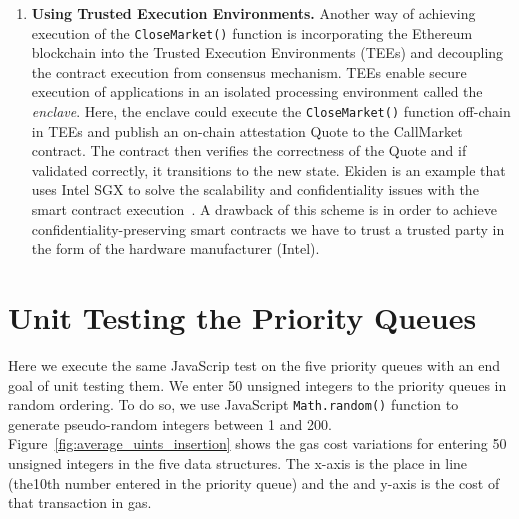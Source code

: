 \begin{enumerate}
\begin{itemize}
\end{itemize}


\item \textbf{{Using Trusted Execution Environments.}} Another way of achieving execution of the \texttt{CloseMarket()} function is incorporating the Ethereum blockchain into the Trusted Execution Environments (TEEs) and decoupling the contract execution from consensus mechanism. TEEs enable secure execution of applications in an isolated processing environment called the \textit{enclave}. Here, the enclave could execute the \texttt{CloseMarket()} function off-chain in TEEs and publish an on-chain attestation Quote to the CallMarket contract. The contract then verifies the correctness of the Quote and if validated correctly, it transitions to the new state. Ekiden is an example that uses Intel SGX to solve the scalability and confidentiality issues with the smart contract execution~\cite{cheng2019ekiden}. A drawback of this scheme is in order to achieve confidentiality-preserving smart contracts we have to trust a trusted party in the form of the hardware manufacturer (\eg Intel).


\end{enumerate}






\section{Unit Testing the Priority Queues}

Here we execute the same JavaScrip test on the five priority queues with an end goal of unit testing them. We enter 50 unsigned integers to the priority queues in random ordering. To do so, we use JavaScript \texttt{Math.random()} function to generate pseudo-random integers between 1 and 200. Figure~\ref{fig:average_uints_insertion} shows the gas cost variations for entering 50 unsigned integers in the five data structures. The x-axis is the place in line (\eg the10th number entered in the priority queue) and the and y-axis is the cost of that transaction in gas. 


